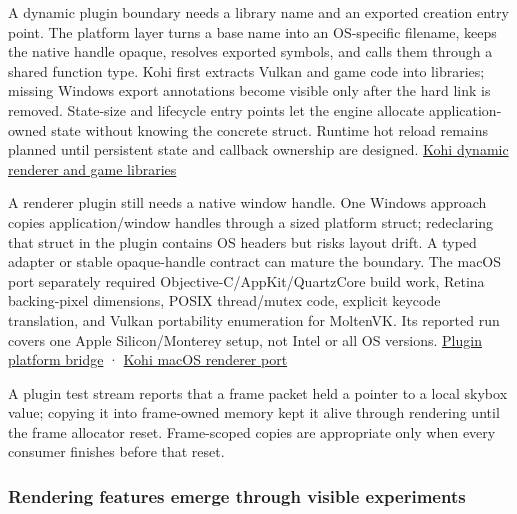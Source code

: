 \hypertarget{06-engine-ii-ch025-load-a-renderer-through-a-small-platform-aware-plugin-contract}{}

A dynamic plugin boundary needs a library name and an exported creation entry point. The platform layer turns a base name into an OS-specific filename, keeps the native handle opaque, resolves exported symbols, and calls them through a shared function type. Kohi first extracts Vulkan and game code into libraries; missing Windows export annotations become visible only after the hard link is removed. State-size and lifecycle entry points let the engine allocate application-owned state without knowing the concrete struct. Runtime hot reload remains planned until persistent state and callback ownership are designed. \href{https://www.youtube.com/watch?v=oigQGZJ1Yc0}{Kohi dynamic renderer and game libraries}

A renderer plugin still needs a native window handle. One Windows approach copies application/window handles through a sized platform struct; redeclaring that struct in the plugin contains OS headers but risks layout drift. A typed adapter or stable opaque-handle contract can mature the boundary. The macOS port separately required Objective-C/AppKit/QuartzCore build work, Retina backing-pixel dimensions, POSIX thread/mutex code, explicit keycode translation, and Vulkan portability enumeration for MoltenVK. Its reported run covers one Apple Silicon/Monterey setup, not Intel or all OS versions. \href{https://www.youtube.com/watch?v=gLP3WWSvICs}{Plugin platform bridge} · \href{https://www.youtube.com/watch?v=g9tvP4qf5sA}{Kohi macOS renderer port}

A plugin test stream reports that a frame packet held a pointer to a local skybox value; copying it into frame-owned memory kept it alive through rendering until the frame allocator reset. Frame-scoped copies are appropriate only when every consumer finishes before that reset.

\subsubsection{Rendering features emerge through visible experiments}\label{06-engine-ii-ch025-rendering-features-emerge-through-visible-experiments}

\hypertarget{06-engine-ii-ch025-rendering-features-emerge-through-visible-experiments}{}

